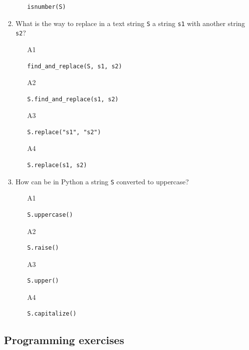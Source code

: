 \begin{enumerate}
\begin{enumerate}
\begin{verbatim}
isnumber(S)
\end{verbatim}
\end{enumerate}
\item What is the way to replace in a text string {\tt S} a string {\tt s1} with another string {\tt s2}?
\begin{enumerate}
\item[A1] 
\begin{verbatim}
find_and_replace(S, s1, s2)
\end{verbatim}
\item[A2] 
\begin{verbatim}
S.find_and_replace(s1, s2)
\end{verbatim}
\item[A3] 
\begin{verbatim}
S.replace("s1", "s2")
\end{verbatim}
\item[A4] 
\begin{verbatim}
S.replace(s1, s2)
\end{verbatim}
\end{enumerate}
\item How can be in Python a string {\tt S} converted to uppercase?
\begin{enumerate}
\item[A1] 
\begin{verbatim}
S.uppercase()
\end{verbatim}
\item[A2] 
\begin{verbatim}
S.raise()
\end{verbatim}
\item[A3] 
\begin{verbatim}
S.upper()
\end{verbatim}
\item[A4] 
\begin{verbatim}
S.capitalize()
\end{verbatim}
\end{enumerate}
\end{enumerate}

\subsection{Programming exercises}\label{subsec:obj}

